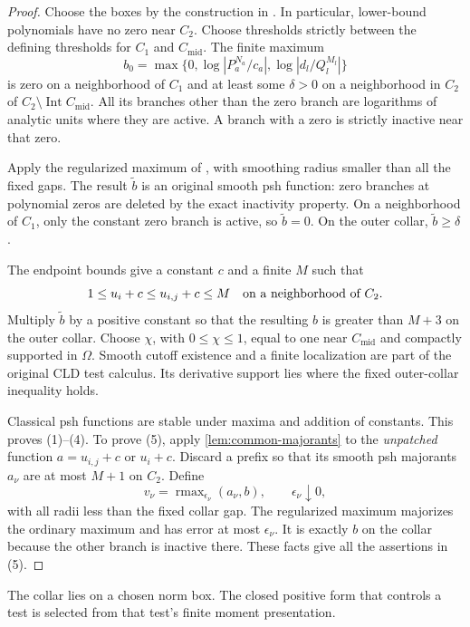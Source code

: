 \documentclass[11pt,reqno]{amsart}
\theoremstyle{definition}
\theoremstyle{remark}
\numberwithin{equation}{section}
\begin{document}
\begin{proof}
Choose the boxes by the construction in \cite[Lemma D.2, \emph{A common collar for decreasing families}]{Bounded}. In
particular, lower-bound polynomials have no zero near $C_2$. Choose
thresholds strictly between the defining thresholds for $C_1$ and
$C_{\mathrm{mid}}$. The finite maximum
\[
 b_0=\max\{0,\log|P_a^{N_a}/c_a|,
                     \log|d_l/Q_l^{M_l}|\}
\]
is zero on a neighborhood of $C_1$ and at least some $\delta>0$ on a
neighborhood in $C_2$ of $C_2\setminus\operatorname{Int}C_{\mathrm{mid}}$.
All its branches other than the zero branch are logarithms of analytic
units where they are active. A branch with a zero is strictly inactive
near that zero.

Apply the regularized maximum of \cite[Proposition \emph{Regularized maximum}]{Continuous}, with
smoothing radius smaller than all the fixed gaps. The result $\widetilde b$
is an original smooth psh function: zero branches at polynomial zeros
are deleted by the exact inactivity property. On a neighborhood of
$C_1$, only the constant zero branch is active, so $\widetilde b=0$.
On the outer collar, $\widetilde b\geq\delta$.

The endpoint bounds give a constant $c$ and a finite $M$ such that
\[
 1\leq u_i+c\leq u_{i,j}+c\leq M
 \quad\hbox{on a neighborhood of }C_2.
\]
Multiply $\widetilde b$ by a positive constant so that the resulting $b$
is greater than $M+3$ on the outer collar. Choose $\chi$, with
$0\leq\chi\leq1$, equal to one near $C_{\mathrm{mid}}$ and compactly
supported in $\Omega$. Smooth cutoff existence and a finite localization
are part of the original CLD test calculus. Its derivative support lies
where the fixed outer-collar inequality holds.

Classical psh functions are stable under maxima and addition of constants.
This proves (1)--(4). To prove (5), apply \cref{lem:common-majorants}
to the \emph{unpatched} function $a=u_{i,j}+c$ or $u_i+c$. Discard a
prefix so that its smooth psh majorants $a_\nu$ are at most $M+1$ on
$C_2$. Define
\[
 v_\nu=\operatorname{rmax}_{\epsilon_\nu}(a_\nu,b),
 \qquad \epsilon_\nu\downarrow0,
\]
with all radii less than the fixed collar gap. The regularized maximum
majorizes the ordinary maximum and has error at most $\epsilon_\nu$.
It is exactly $b$ on the collar because the other branch is inactive
there. These facts give all the assertions in (5).
\end{proof}

The collar lies on a chosen norm box. The closed positive form that
controls a test is selected from that test's finite moment presentation.
\end{document}
